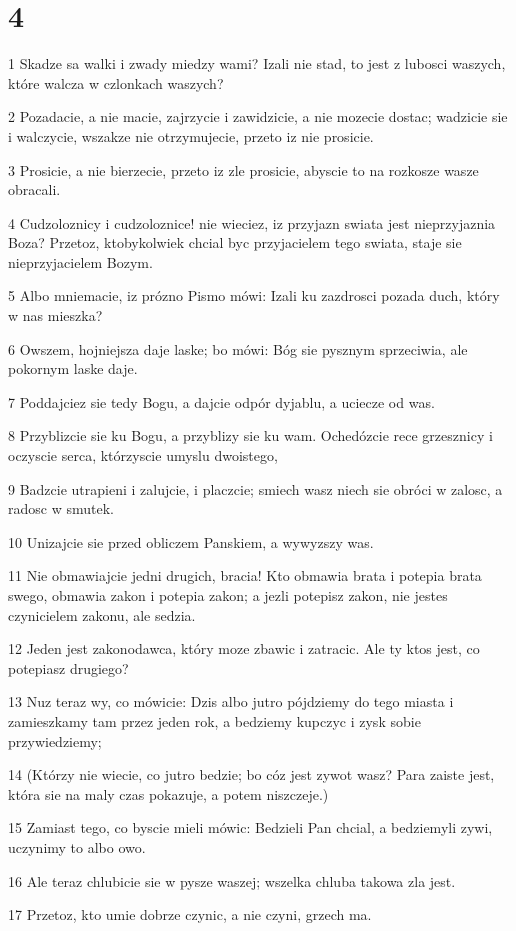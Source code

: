 \chapter{4}

\par 1 Skadze sa walki i zwady miedzy wami? Izali nie stad, to jest z lubosci waszych, które walcza w czlonkach waszych?
\par 2 Pozadacie, a nie macie, zajrzycie i zawidzicie, a nie mozecie dostac; wadzicie sie i walczycie, wszakze nie otrzymujecie, przeto iz nie prosicie.
\par 3 Prosicie, a nie bierzecie, przeto iz zle prosicie, abyscie to na rozkosze wasze obracali.
\par 4 Cudzoloznicy i cudzoloznice! nie wieciez, iz przyjazn swiata jest nieprzyjaznia Boza? Przetoz, ktobykolwiek chcial byc przyjacielem tego swiata, staje sie nieprzyjacielem Bozym.
\par 5 Albo mniemacie, iz prózno Pismo mówi: Izali ku zazdrosci pozada duch, który w nas mieszka?
\par 6 Owszem, hojniejsza daje laske; bo mówi: Bóg sie pysznym sprzeciwia, ale pokornym laske daje.
\par 7 Poddajciez sie tedy Bogu, a dajcie odpór dyjablu, a uciecze od was.
\par 8 Przyblizcie sie ku Bogu, a przyblizy sie ku wam. Ochedózcie rece grzesznicy i oczyscie serca, którzyscie umyslu dwoistego,
\par 9 Badzcie utrapieni i zalujcie, i placzcie; smiech wasz niech sie obróci w zalosc, a radosc w smutek.
\par 10 Unizajcie sie przed obliczem Panskiem, a wywyzszy was.
\par 11 Nie obmawiajcie jedni drugich, bracia! Kto obmawia brata i potepia brata swego, obmawia zakon i potepia zakon; a jezli potepisz zakon, nie jestes czynicielem zakonu, ale sedzia.
\par 12 Jeden jest zakonodawca, który moze zbawic i zatracic. Ale ty ktos jest, co potepiasz drugiego?
\par 13 Nuz teraz wy, co mówicie: Dzis albo jutro pójdziemy do tego miasta i zamieszkamy tam przez jeden rok, a bedziemy kupczyc i zysk sobie przywiedziemy;
\par 14 (Którzy nie wiecie, co jutro bedzie; bo cóz jest zywot wasz? Para zaiste jest, która sie na maly czas pokazuje, a potem niszczeje.)
\par 15 Zamiast tego, co byscie mieli mówic: Bedzieli Pan chcial, a bedziemyli zywi, uczynimy to albo owo.
\par 16 Ale teraz chlubicie sie w pysze waszej; wszelka chluba takowa zla jest.
\par 17 Przetoz, kto umie dobrze czynic, a nie czyni, grzech ma.

